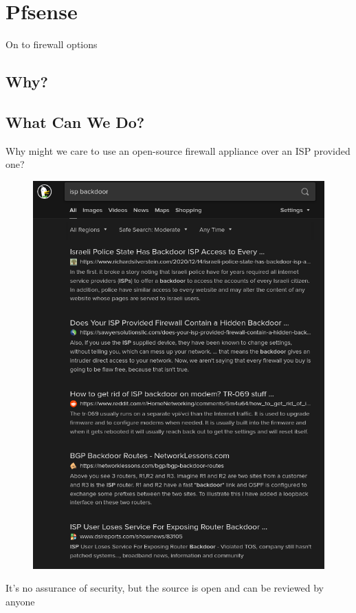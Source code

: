 \documentclass{beamer}
\begin{document}
\section{Pfsense}
\begin{frame}
    \begin{center}
        On to firewall options
    \end{center}
\end{frame}
\subsection{Why?}

\subsection{What Can We Do?}
\begin{frame}
    \begin{center}
        Why might we care to use an open-source firewall appliance over an ISP provided one?
    \end{center}
    \begin{figure}
        \centering
        \includegraphics[width=\textwidth,keepaspectratio]{../resources/isp_backdoor_search.png}
    \end{figure}
    It's no assurance of security, but the source is open and can be reviewed by anyone
\end{frame}
\end{document}
